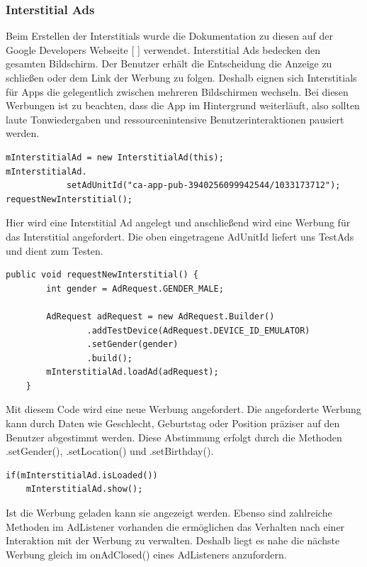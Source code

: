\documentclass[FIPLY_base.tex]{subfiles}
\begin{document}
\subsubsection{Interstitial Ads}
Beim Erstellen der Interstitials wurde die Dokumentation zu diesen auf der Google Developers Webseite [ \cite{gdInterstitials}] verwendet. \newline 
Interstitial Ads bedecken den gesamten Bildschirm. Der Benutzer erhält die Entscheidung die Anzeige zu schließen oder dem Link der Werbung zu folgen. Deshalb eignen sich Interstitials für Apps die gelegentlich zwischen mehreren Bildschirmen wechseln.
Bei diesen Werbungen ist zu beachten, dass die App im Hintergrund weiterläuft, also sollten laute Tonwiedergaben und ressourcenintensive Benutzerinteraktionen pausiert werden.
\ \\
\begin{lstlisting}
mInterstitialAd = new InterstitialAd(this);
mInterstitialAd.
       		setAdUnitId("ca-app-pub-3940256099942544/1033173712");
requestNewInterstitial();
\end{lstlisting}
Hier wird eine Interstitial Ad angelegt und anschließend wird eine Werbung für das Interstitial angefordert. 
Die oben eingetragene AdUnitId liefert uns TestAds und dient zum Testen.
\ \\
\begin{lstlisting}
public void requestNewInterstitial() {
        int gender = AdRequest.GENDER_MALE;
        
        AdRequest adRequest = new AdRequest.Builder()
                .addTestDevice(AdRequest.DEVICE_ID_EMULATOR)
                .setGender(gender)
                .build();
        mInterstitialAd.loadAd(adRequest);
    }
\end{lstlisting}
Mit diesem Code wird eine neue Werbung angefordert. Die angeforderte Werbung kann durch Daten wie Geschlecht, Geburtstag oder Position präziser auf den Benutzer abgestimmt werden.
Diese Abstimmung erfolgt durch die Methoden .setGender(), .setLocation() und .setBirthday().	
\ \\
\begin{lstlisting}
if(mInterstitialAd.isLoaded()) 
    mInterstitialAd.show();
\end{lstlisting}
Ist die Werbung geladen kann sie angezeigt werden.\newline
Ebenso sind zahlreiche Methoden im AdListener vorhanden die ermöglichen das Verhalten nach einer Interaktion mit der Werbung zu verwalten.\newline
Deshalb liegt es nahe die nächste Werbung gleich im onAdClosed() eines AdListeners anzufordern.
\end{document}
